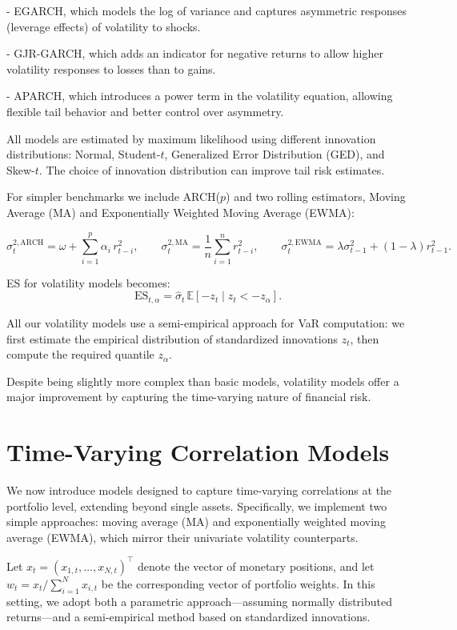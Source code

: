 \documentclass[12pt]{article}
\begin{document}
- EGARCH, which models the log of variance and captures asymmetric responses (leverage effects) of volatility to shocks.

- GJR-GARCH, which adds an indicator for negative returns to allow higher volatility responses to losses than to gains.

- APARCH, which introduces a power term in the volatility equation, allowing flexible tail behavior and better control over asymmetry.

All models are estimated by maximum likelihood using different innovation distributions: Normal, Student-\( t \), Generalized Error Distribution (GED), and Skew-\( t \). The choice of innovation distribution can improve tail risk estimates.

For simpler benchmarks we include ARCH(\( p \)) and two rolling estimators, Moving Average (MA) and Exponentially Weighted Moving Average (EWMA):

\[
\sigma_{t}^{2,\mathrm{ARCH}}=\omega+\sum_{i=1}^{p} \alpha_{i}\, r_{t-i}^{2},\qquad
\sigma_{t}^{2,\mathrm{MA}}=\frac{1}{n}\sum_{i=1}^{n} r_{t-i}^{2},\qquad
\sigma_{t}^{2,\mathrm{EWMA}}=\lambda \sigma_{t-1}^{2}+(1-\lambda) r_{t-1}^{2}.
\]

ES for volatility models becomes:
\[
    \text{ES}_{t,\alpha} = \hat{\sigma}_t \, \mathbb{E}[-z_t \mid z_t < -z_\alpha].
\] 

All our volatility models use a semi-empirical approach for VaR computation: we first estimate the empirical distribution of standardized innovations \( z_t \), then compute the required quantile \( z_\alpha \).

Despite being slightly more complex than basic models, volatility models offer a major improvement by capturing the time-varying nature of financial risk.


\section{Time-Varying Correlation Models}

We now introduce models designed to capture time-varying correlations at the portfolio level, extending beyond single assets. Specifically, we implement two simple approaches: moving average (MA) and exponentially weighted moving average (EWMA), which mirror their univariate volatility counterparts.

Let \( x_t = (x_{1,t}, \dots, x_{N,t})^\top \) denote the vector of monetary positions, and let \( w_t = x_t / \sum_{i=1}^N x_{i,t} \) be the corresponding vector of portfolio weights. In this setting, we adopt both a parametric approach—assuming normally distributed returns—and a semi-empirical method based on standardized innovations.
\end{document}
